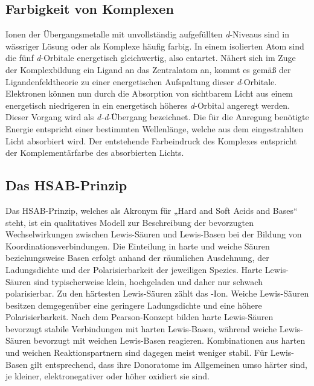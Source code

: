 \subsection{Farbigkeit von Komplexen}
Ionen der Übergangsmetalle mit unvollständig aufgefüllten \textit{d}-Niveaus sind in wässriger Lösung oder als Komplexe häufig farbig. In einem isolierten Atom sind die fünf \textit{d}-Orbitale energetisch gleichwertig, also entartet. Nähert sich im Zuge der Komplexbildung ein Ligand an das Zentralatom an, kommt es gemäß der Ligandenfeldtheorie zu einer energetischen Aufspaltung dieser \textit{d}-Orbitale. Elektronen können nun durch die Absorption von sichtbarem Licht aus einem energetisch niedrigeren in ein energetisch höheres \textit{d}-Orbital angeregt werden. Dieser Vorgang wird als \textit{d-d}-Übergang bezeichnet. Die für die Anregung benötigte Energie entspricht einer bestimmten Wellenlänge, welche aus dem eingestrahlten Licht absorbiert wird. Der entstehende Farbeindruck des Komplexes entspricht der Komplementärfarbe des absorbierten Lichts. \cite{brown_chemie_2011}


\subsection{Das HSAB-Prinzip} \label{sec:HSAB}

Das HSAB-Prinzip, welches als Akronym für „Hard and Soft Acids and Bases“ steht, ist ein qualitatives Modell zur Beschreibung der bevorzugten Wechselwirkungen zwischen Lewis-Säuren und Lewis-Basen bei der Bildung von Koordinationsverbindungen. Die Einteilung in harte und weiche Säuren beziehungsweise Basen erfolgt anhand der räumlichen Ausdehnung, der Ladungsdichte und der Polarisierbarkeit der jeweiligen Spezies. Harte Lewis-Säuren sind typischerweise klein, hochgeladen und daher nur schwach polarisierbar. Zu den härtesten Lewis-Säuren zählt das -Ion. Weiche Lewis-Säuren besitzen demgegenüber eine geringere Ladungsdichte und eine höhere Polarisierbarkeit. Nach dem Pearson-Konzept bilden harte Lewis-Säuren bevorzugt stabile Verbindungen mit harten Lewis-Basen, während weiche Lewis-Säuren bevorzugt mit weichen Lewis-Basen reagieren. Kombinationen aus harten und weichen Reaktionspartnern sind dagegen meist weniger stabil. Für Lewis-Basen gilt entsprechend, dass ihre Donoratome im Allgemeinen umso härter sind, je kleiner, elektronegativer oder höher oxidiert sie sind. \cite{skript}

